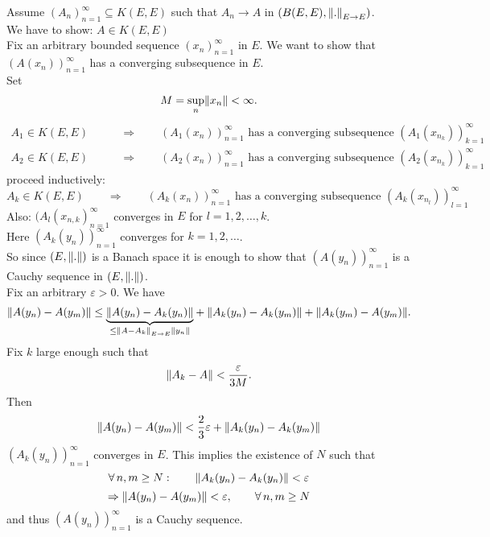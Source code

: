 \begin{beweis}
	Assume $(A_n)_{n=1}^{\infty} \subseteq K(E,E)$ such that $A_n \to A$ in $(B(E,E), \norm{.}_{E \to E})$. \\
	 We have to show: $A \in K(E,E)$ \\
	 Fix an arbitrary bounded sequence $(x_n)_{n=1}^{\infty}$ in $E$. We want to show that $(A(x_n))_{n=1}^{\infty}$ has a converging subsequence in $E$. \\
	 Set \[
	 	M = \sup_{n} \norm{x_n} < \infty.
	 \]
	 \begin{align*}
	 	A_1 \in K(E,E) \qquad &\Rightarrow \qquad (A_1(x_n))_{n=1}^{\infty} \text{ has a converging subsequence }(A_1(x _{n_k}))_{k=1}^{\infty} \\
		A_2 \in K(E,E) \qquad &\Rightarrow \qquad (A_2(x_n))_{n=1}^{\infty} \text{ has a converging subsequence }(A_2(x _{n_k}))_{k=1}^{\infty}
	 \end{align*}
	 proceed inductively:
	 \[
	 	A_k \in K(E,E) \qquad \Rightarrow \qquad (A_k(x_n))_{n=1}^{\infty} \text{ has a converging subsequence }(A_k(x _{n_l}))_{l=1}^{\infty}
	 \] 
	 Also: $(A_l(x_{n,k})_{n=1}^{\infty}$ converges in $E$ for $l=1,2,\dots,k$. \\ Here $(A_k(y_n))_{n=1}^{\infty}$ converges for $k=1,2,\dots$. \\
	 So since $(E,\norm{.})$ is a Banach space it is enough to show that $(A(y_n))_{n=1}^{\infty}$ is a Cauchy sequence in $(E,\norm{.})$. \\
	 Fix an arbitrary $\varepsilon >0$. We have
	 \[
	 	\norm{A(y_n)-A(y_m)} \leq \underset{\leq \norm{A-A_k}_{E \to E} \norm{y_n}}{\underbrace{\norm{A(y_n)-A_k(y_n)}}} + \norm{A_k(y_n)- A_k(y_m)} + \norm{A_k(y_m)-A(y_m)}.
	 \]
	 Fix $k$ large enough such that
	 \[
	 	\norm{A_k-A} < \frac{\varepsilon}{3M}.
	 \]
	 Then 
	 \[
	 	\norm{A(y_n)-A(y_m)} < \frac{2}{3} \varepsilon+ \norm{A_k(y_n)-A_k(y_m)}
	 \]
	 $(A_k(y_n))_{n=1}^{\infty}$ converges in $E$. This implies the existence of $N$ such that
	 \[
	 	\forall\, n,m \geq N: \qquad \norm{A_k(y_n)-A_k(y_n)}< \varepsilon
	 \]
	 \[
	 	\Rightarrow \norm{A(y_n)-A(y_m)} < \varepsilon, \qquad \forall\, n,m \geq N
	 \]
	 and thus $(A(y_n))_{n=1}^{\infty}$ is a Cauchy sequence.
\end{beweis}

